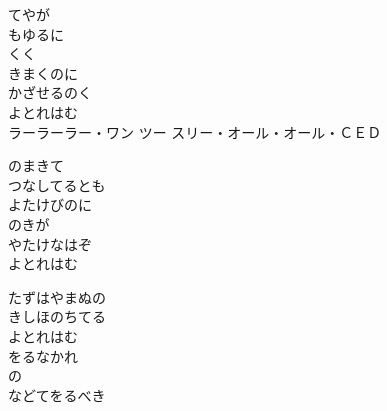 \documentclass[10pt,b5j]{tarticle} %
\begin{document}
\vspace{1.5em} %
\newcommand{\linespace}{0.5em} %
\newcommand{\blocksize}{0.5\hsize} %
\begin{enumerate} %
    \begin{minipage}[c]{\blocksize}
    
        \vspace{\linespace}
        \item
        てやが\\
        もゆるに\\
        くく\\
        きまくのに\\
        かざせるのく\\
        よとれはむ\\
        ラーラーラー・ワン ツー スリー・オール・オール・ＣＥＤ
        
        \vspace{\linespace}
        \item
        のまきて\\
        つなしてるとも\\
        よたけびのに\\
        のきが\\
        やたけなはぞ\\
        よとれはむ
        
        \vspace{\linespace}
        \item
        たずはやまぬの\\
        きしほのちてる\\
        よとれはむ\\
        をるなかれ\\
        の\\
        などてをるべき
    
    \end{minipage}
\end{enumerate} %
\end{document}
